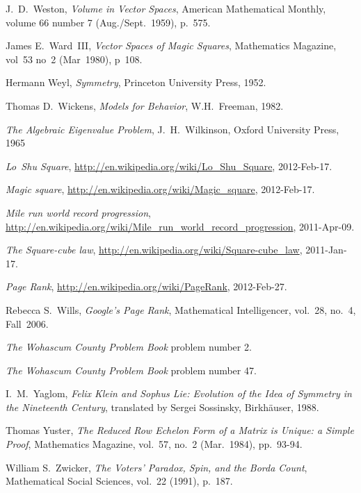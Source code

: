 \begin{thebibliography}{\makebox[2em][c]{{}\hfil{}}}
  J.~D.\ Weston,
  \emph{Volume in Vector Spaces},
  American Mathematical Monthly,
  volume 66 number 7 (Aug./Sept.\ 1959),
  p.~575.

  James E.\ Ward~III,
  \emph{Vector Spaces of Magic Squares},
  Mathematics Magazine,
  vol~53 no~2 (Mar~1980),
  p~108.

  Hermann Weyl,
  \emph{Symmetry},
  Princeton University Press,
  1952.

  Thomas D.~Wickens,
  \emph{Models for Behavior},
  W.H.~Freeman,
  1982.

  \emph{The Algebraic Eigenvalue Problem},
  J.~H.~Wilkinson,
  Oxford University Press,
  1965

  \emph{Lo~Shu Square},
  \url{http://en.wikipedia.org/wiki/Lo_Shu_Square},
  2012-Feb-17.

  \emph{Magic square},
  \url{http://en.wikipedia.org/wiki/Magic_square},
  2012-Feb-17.

  \emph{Mile run world record progression},
  \url{http://en.wikipedia.org/wiki/Mile_run_world_record_progression},
  2011-Apr-09.

  \emph{The Square-cube law},
  \url{http://en.wikipedia.org/wiki/Square-cube_law},
  2011-Jan-17.

  \emph{Page Rank},
  \url{http://en.wikipedia.org/wiki/PageRank},
  2012-Feb-27.

  Rebecca S.~Wills,
  \emph{Google's Page Rank},
  Mathematical Intelligencer,
  vol.~28, no.~4, Fall~2006.

  \emph{The Wohascum County Problem Book}
  problem number 2.

  \emph{The Wohascum County Problem Book}
  problem number 47.

  I.\ M.~Yaglom,
  \emph{Felix Klein and Sophus Lie: Evolution of the Idea of
   Symmetry in the Nineteenth Century},
  translated by Sergei Sossinsky,
  Birkh\"auser,
  1988.

  Thomas Yuster,
  \emph{The Reduced Row Echelon Form of a Matrix is Unique: a Simple Proof},
  Mathematics Magazine,
  vol.~57, no.~2 (Mar.~1984),
  pp.~93-94.

  William S.~Zwicker,
  \emph{The Voters' Paradox, Spin, and the Borda Count},
  Mathematical Social Sciences,
  vol.~22 (1991),
  p.~187. 

\end{thebibliography}

